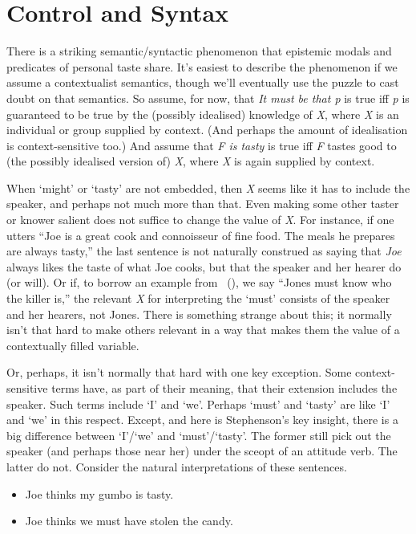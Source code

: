 \documentclass[
  11pt,
  letterpaper,
  DIV=11,
  numbers=noendperiod,
  twoside]{scrartcl}
\providecommand{\tightlist}{%
  \setlength{\itemsep}{0pt}\setlength{\parskip}{0pt}}
\begin{document}
\section{Control and Syntax}\label{controlandsyntax}

There is a striking semantic/syntactic phenomenon that epistemic modals
and predicates of personal taste share. It's easiest to describe the
phenomenon if we assume a contextualist semantics, though we'll
eventually use the puzzle to cast doubt on that semantics. So assume,
for now, that \emph{It must be that p} is true iff \emph{p} is
guaranteed to be true by the (possibly idealised) knowledge of \emph{X},
where \emph{X} is an individual or group supplied by context. (And
perhaps the amount of idealisation is context-sensitive too.) And assume
that \emph{F is tasty} is true iff \emph{F} tastes good to (the possibly
idealised version of) \emph{X}, where \emph{X} is again supplied by
context.

When `might' or `tasty' are not embedded, then \emph{X} seems like it
has to include the speaker, and perhaps not much more than that. Even
making some other taster or knower salient does not suffice to change
the value of \emph{X}. For instance, if one utters ``Joe is a great cook
and connoisseur of fine food. The meals he prepares are always tasty,''
the last sentence is not naturally construed as saying that \emph{Joe}
always likes the taste of what Joe cooks, but that the speaker and her
hearer do (or will). Or if, to borrow an example from
~(), we say
``Jones must know who the killer is,'' the relevant \emph{X} for
interpreting the `must' consists of the speaker and her hearers, not
Jones. There is something strange about this; it normally isn't that
hard to make others relevant in a way that makes them the value of a
contextually filled variable.

Or, perhaps, it isn't normally that hard with one key exception. Some
context-sensitive terms have, as part of their meaning, that their
extension includes the speaker. Such terms include `I' and `we'. Perhaps
`must' and `tasty' are like `I' and `we' in this respect. Except, and
here is Stephenson's key insight, there is a big difference between
`I'/`we' and `must'/`tasty'. The former still pick out the speaker (and
perhaps those near her) under the sceopt of an attitude verb. The latter
do not. Consider the natural interpretations of these sentences.

\begin{itemize}
\tightlist
\item
  Joe thinks my gumbo is tasty.
\item
  Joe thinks we must have stolen the candy.
\end{itemize}
\end{document}
